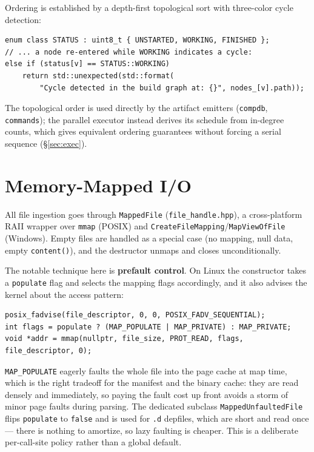 \documentclass[11pt]{article}
\begin{document}
Ordering is established by a depth-first topological sort with three-color cycle
detection:

\begin{lstlisting}
enum class STATUS : uint8_t { UNSTARTED, WORKING, FINISHED };
// ... a node re-entered while WORKING indicates a cycle:
else if (status[v] == STATUS::WORKING)
    return std::unexpected(std::format(
        "Cycle detected in the build graph at: {}", nodes_[v].path));
\end{lstlisting}

The topological order is used directly by the artifact emitters
(\texttt{compdb}, \texttt{commands}); the parallel executor instead derives its
schedule from in-degree counts, which gives equivalent ordering guarantees
without forcing a serial sequence (\S\ref{sec:exec}).

\section{Memory-Mapped I/O}\label{sec:mmap}

All file ingestion goes through \lstinline|MappedFile| (\texttt{file\_handle.hpp}),
a cross-platform RAII wrapper over \lstinline|mmap| (POSIX) and
\lstinline|CreateFileMapping|/\lstinline|MapViewOfFile| (Windows). Empty files
are handled as a special case (no mapping, null data, empty
\lstinline|content()|), and the destructor unmaps and closes unconditionally.

The notable technique here is \textbf{prefault control}. On Linux the
constructor takes a \lstinline|populate| flag and selects the mapping flags
accordingly, and it also advises the kernel about the access pattern:

\begin{lstlisting}
posix_fadvise(file_descriptor, 0, 0, POSIX_FADV_SEQUENTIAL);
int flags = populate ? (MAP_POPULATE | MAP_PRIVATE) : MAP_PRIVATE;
void *addr = mmap(nullptr, file_size, PROT_READ, flags, file_descriptor, 0);
\end{lstlisting}

\lstinline|MAP_POPULATE| eagerly faults the whole file into the page cache at
map time, which is the right tradeoff for the manifest and the binary cache:
they are read densely and immediately, so paying the fault cost up front avoids
a storm of minor page faults during parsing. The dedicated subclass
\lstinline|MappedUnfaultedFile| flips \lstinline|populate| to \lstinline|false|
and is used for \texttt{.d} depfiles, which are short and read once --- there is
nothing to amortize, so lazy faulting is cheaper. This is a deliberate
per-call-site policy rather than a global default.
\end{document}

